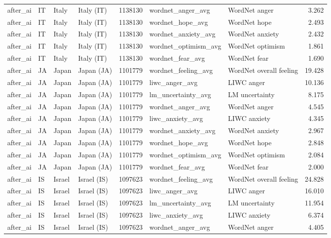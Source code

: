 \begin{tabular}{llllrllr}
after\_ai & IT & Italy & Italy (IT) & 1138130 & wordnet\_anger\_avg & WordNet anger & 3.262 \\
after\_ai & IT & Italy & Italy (IT) & 1138130 & wordnet\_hope\_avg & WordNet hope & 2.493 \\
after\_ai & IT & Italy & Italy (IT) & 1138130 & wordnet\_anxiety\_avg & WordNet anxiety & 2.432 \\
after\_ai & IT & Italy & Italy (IT) & 1138130 & wordnet\_optimism\_avg & WordNet optimism & 1.861 \\
after\_ai & IT & Italy & Italy (IT) & 1138130 & wordnet\_fear\_avg & WordNet fear & 1.690 \\
after\_ai & JA & Japan & Japan (JA) & 1101779 & wordnet\_feeling\_avg & WordNet overall feeling & 19.428 \\
after\_ai & JA & Japan & Japan (JA) & 1101779 & liwc\_anger\_avg & LIWC anger & 10.136 \\
after\_ai & JA & Japan & Japan (JA) & 1101779 & lm\_uncertainty\_avg & LM uncertainty & 8.175 \\
after\_ai & JA & Japan & Japan (JA) & 1101779 & wordnet\_anger\_avg & WordNet anger & 4.545 \\
after\_ai & JA & Japan & Japan (JA) & 1101779 & liwc\_anxiety\_avg & LIWC anxiety & 4.345 \\
after\_ai & JA & Japan & Japan (JA) & 1101779 & wordnet\_anxiety\_avg & WordNet anxiety & 2.967 \\
after\_ai & JA & Japan & Japan (JA) & 1101779 & wordnet\_hope\_avg & WordNet hope & 2.848 \\
after\_ai & JA & Japan & Japan (JA) & 1101779 & wordnet\_optimism\_avg & WordNet optimism & 2.084 \\
after\_ai & JA & Japan & Japan (JA) & 1101779 & wordnet\_fear\_avg & WordNet fear & 2.000 \\
after\_ai & IS & Israel & Israel (IS) & 1097623 & wordnet\_feeling\_avg & WordNet overall feeling & 24.828 \\
after\_ai & IS & Israel & Israel (IS) & 1097623 & liwc\_anger\_avg & LIWC anger & 16.010 \\
after\_ai & IS & Israel & Israel (IS) & 1097623 & lm\_uncertainty\_avg & LM uncertainty & 11.954 \\
after\_ai & IS & Israel & Israel (IS) & 1097623 & liwc\_anxiety\_avg & LIWC anxiety & 6.374 \\
after\_ai & IS & Israel & Israel (IS) & 1097623 & wordnet\_anger\_avg & WordNet anger & 4.405 \\

\end{tabular}
